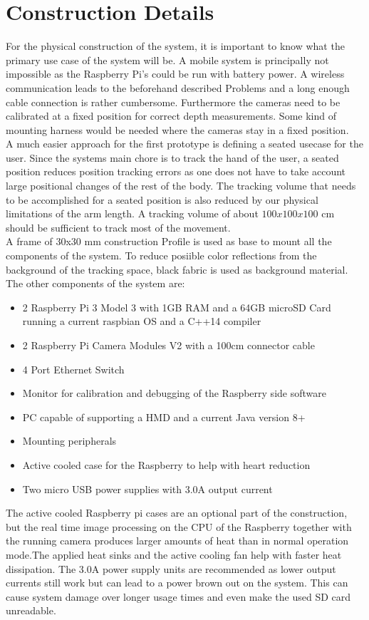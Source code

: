 \section{Construction Details}
For the physical construction of the system, it is important to know what the primary use case of the system will be. A mobile system is principally not impossible as the Raspberry Pi's could be run with battery power. A wireless communication leads to the beforehand described Problems and a long enough cable connection is rather cumbersome. Furthermore the cameras need to be calibrated at a fixed position for correct depth measurements. Some kind of mounting harness would be needed where the cameras stay in a fixed position.\\
A much easier approach for the first prototype is defining a seated usecase for the user. Since the systems main chore is to track the hand of the user, a seated position reduces position tracking errors as one does not have to take account large positional changes of the rest of the body.
The tracking volume that needs to be accomplished for a seated position is also reduced by our physical limitations of the arm length. A tracking volume of about $100x100x100$ cm should be sufficient to track most of the movement.\\
A frame of 30x30 mm construction Profile is used as base to mount all the components of the system. To reduce posiible color reflections from the background of the tracking space, black fabric is used as background material. The other components of the system are:
\begin{itemize}
\item 2 Raspberry Pi 3 Model 3 with 1GB RAM and a 64GB microSD Card running a current raspbian OS and a C++14 compiler
\item 2 Raspberry Pi Camera Modules V2 with a 100cm connector cable
\item 4 Port Ethernet Switch
\item Monitor for calibration and debugging of the Raspberry side software
\item PC capable of supporting a HMD and a current Java version 8+
\item Mounting peripherals
\item Active cooled case for the Raspberry to help with heart reduction
\item Two micro USB power supplies with 3.0A output current
\end{itemize}
The active cooled Raspberry pi cases are an optional part of the construction, but the real time image processing on the CPU of the Raspberry together with the running camera produces larger amounts of heat than in normal operation mode.The applied heat sinks and the active cooling fan help with faster heat dissipation. The 3.0A power supply units are recommended as lower output currents still work but can lead to a power brown out on the system. This can cause system damage over longer usage times and even make the used SD card unreadable.
